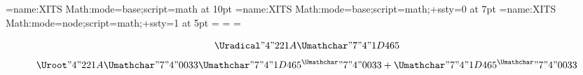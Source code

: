 

\font\4={name:XITS Math:mode=base;script=math} at 10pt
\font\5={name:XITS Math:mode=base;script=math;+ssty=0} at 7pt
\font\6={name:XITS Math:mode=node;script=math;+ssty=1} at 5pt
=\4 =\5 =\6

\def\x{\Umathchar"7 "4 "1D465 }
\def\y{\Umathchar"7 "4 "1D465 }
\def\3{\Umathchar"7 "4 "0033 }

$$\Uradical "4 "221A {\x}$$
$$\Uroot    "4 "221A {\3}{\x^\3+\y^\3}$$
\bye


